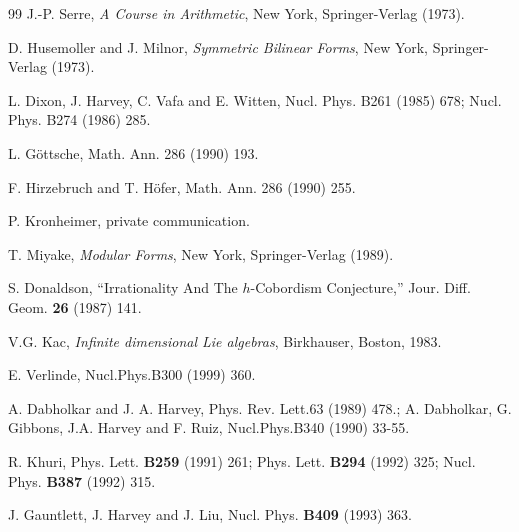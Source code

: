 \documentclass[12pt]{article}
\numberwithin{equation}{section}
\begin{document}
\begin{thebibliography}{99}
  J.-P. Serre, {\it A Course in Arithmetic}, New York, Springer-Verlag (1973).

  D. Husemoller and J. Milnor, {\it Symmetric Bilinear Forms}, New
  York, Springer-Verlag (1973).

  L. Dixon, J. Harvey, C. Vafa and E. Witten, Nucl. Phys. B261 (1985)
  678; Nucl. Phys. B274 (1986) 285.

  L. G\"ottsche, Math. Ann. 286 (1990) 193.

  F. Hirzebruch and T. H\"ofer, Math. Ann. 286 (1990) 255.

  P. Kronheimer, private communication.

  T. Miyake, {\it Modular Forms}, New York, Springer-Verlag (1989).

  S. Donaldson, ``Irrationality And The $h$-Cobordism Conjecture,''
  Jour. Diff. Geom. {\bf 26} (1987) 141.

  V.G. Kac, {\it Infinite dimensional Lie algebras}, Birkhauser, Boston, 1983.

  E. Verlinde, Nucl.Phys.B300 (1999) 360.

  A. Dabholkar and J. A. Harvey, Phys. Rev. Lett.63 (1989) 478.;
  A. Dabholkar, G. Gibbons, J.A. Harvey and F. Ruiz, Nucl.Phys.B340
  (1990) 33-55.

  R. Khuri, Phys. Lett. {\bf B259} (1991) 261; Phys. Lett. {\bf B294}
  (1992) 325; Nucl. Phys. {\bf B387} (1992) 315.

  J. Gauntlett, J. Harvey and J. Liu, Nucl. Phys. {\bf B409} (1993) 363.

\end{thebibliography}
\end{document}

